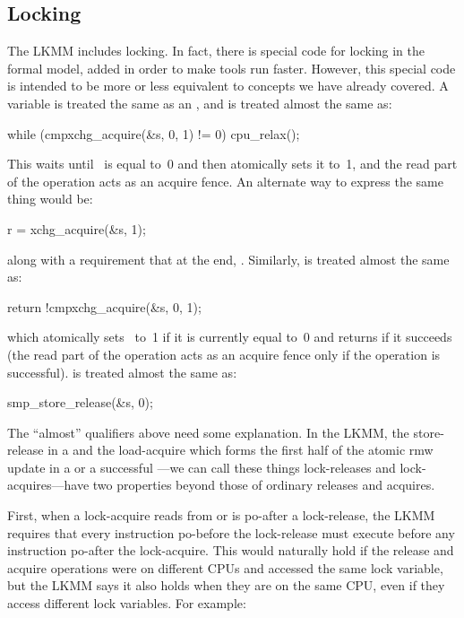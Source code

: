 \subsection{Locking}
\label{sec:docs:explanation:Locking}

The LKMM includes locking.
In fact, there is special code for locking
in the formal model, added in order to make tools run faster.
However, this special code is intended to be more or less equivalent
to concepts we have already covered.
A  variable is treated
the same as an , and  is treated almost the same as:

\begin{VerbatimU}
	while (cmpxchg_acquire(&s, 0, 1) != 0)
		cpu_relax();
\end{VerbatimU}

This waits until ~is equal to~0 and then atomically sets it to~1,
and the read part of the  operation acts as an acquire fence.
An alternate way to express the same thing would be:

\begin{VerbatimU}
	r = xchg_acquire(&s, 1);
\end{VerbatimU}

\noindent%
along with a requirement that at the end, .
Similarly,
 is treated almost the same as:

\begin{VerbatimU}
	return !cmpxchg_acquire(&s, 0, 1);
\end{VerbatimU}

\noindent%
which atomically sets~ to~1 if it is currently equal to~0 and returns
 if it succeeds (the read part of the  operation acts as an
acquire fence only if the operation is successful).
is treated almost the same as:

\begin{VerbatimU}
	smp_store_release(&s, 0);
\end{VerbatimU}

The ``almost'' qualifiers above need some explanation.
In the LKMM, the
store-release in a  and the load-acquire which forms the
first half of the atomic rmw update in a  or a successful
---we can call these things lock-releases and
lock-acquires---have two properties beyond those of ordinary releases
and acquires.

First, when a lock-acquire reads from or is po-after a lock-release,
the LKMM requires that every instruction po-before the lock-release
must execute before any instruction po-after the lock-acquire.
This
would naturally hold if the release and acquire operations were on
different CPUs and accessed the same lock variable, but the LKMM says
it also holds when they are on the same CPU, even if they access
different lock variables.
For example:

